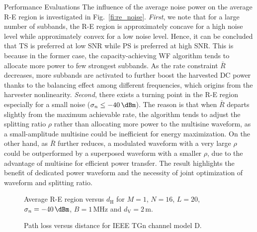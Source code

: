 \documentclass[journal]{IEEEtran}
\begin{document}
\begin{section}{Performance Evaluations}
		The influence of the average noise power on the average R-E region is investigated in Fig.~\ref{fi:re_noise}. \textit{First}, we note that for a large number of subbands, the R-E region is approximately concave for a high noise level while approximately convex for a low noise level. Hence, it can be concluded that TS is preferred at low SNR while PS is preferred at high SNR. This is because in the former case, the capacity-achieving WF algorithm tends to allocate more power to few strongest subbands. As the rate constraint $\bar{R}$ decreases, more subbands are activated to further boost the harvested DC power thanks to the balancing effect among different frequencies, which origins from the harvester nonlinearity. \textit{Second}, there exists a turning point in the R-E region especially for a small noise ($\sigma_n \le -40\,\si{\dBm}$). The reason is that when $\bar{R}$ departs slightly from the maximum achievable rate, the algorithm tends to adjust the splitting ratio $\rho$ rather than allocating more power to the multisine waveform, as a small-amplitude multisine could be inefficient for energy maximization. On the other hand, as $\bar{R}$ further reduces, a modulated waveform with a very large $\rho$ could be outperformed by a superposed waveform with a smaller $\rho$, due to the advantage of multisine for efficient power transfer. The result highlights the benefit of dedicated power waveform and the necessity of joint optimization of waveform and splitting ratio.

		\begin{figure}[!t]
			\centering
			\begin{adjustbox}{width=0.9\columnwidth}
				
			\end{adjustbox}
			\caption{Average R-E region versus $d_{\mathrm{H}}$ for $M=1$, $N=16$, $L=20$, $\sigma_n=-40\,\si{\dBm}$, $B=1\,\si{\MHz}$ and $d_{\mathrm{V}}=2\,\si{\meter}$.}
			\label{fi:re_distance}
		\end{figure}

		\begin{figure}[!t]
			\centering
			\begin{adjustbox}{width=0.9\columnwidth}
				
			\end{adjustbox}
			\caption{Path loss versus distance for IEEE TGn channel model D.}
			\label{fi:path_loss}
		\end{figure}


\end{section}
\end{document}
